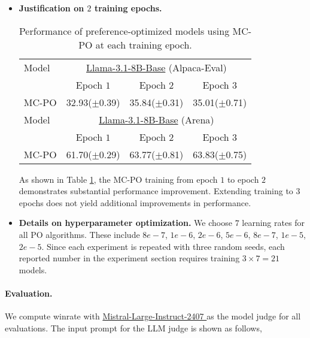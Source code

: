\begin{itemize}
\item \textbf{Justification on $2$ training epochs.}
\begin{table}[h!]
\centering
\begin{tabular}{l|ccc}
\hline
Model & \multicolumn{3}{|c}{\href{https://huggingface.co/allenai/Llama-3.1-Tulu-3-8B-SFT}{Llama-3.1-8B-Base} (Alpaca-Eval)} \\
& Epoch $1$ & Epoch $2$ & Epoch $3$ \\
MC-PO & 32.93($\pm$0.39) & 35.84($\pm$0.31) & 35.01($\pm$0.71) \\ 
\hline
Model & \multicolumn{3}{|c}{\href{https://huggingface.co/allenai/Llama-3.1-Tulu-3-8B-SFT}{Llama-3.1-8B-Base} (Arena)} \\
& Epoch $1$ & Epoch $2$ & Epoch $3$ \\
MC-PO & 61.70($\pm$0.29) & 63.77($\pm$0.81) & 63.83($\pm$0.75) \\ 
\hline
\end{tabular}
\caption{
Performance of preference-optimized models using MC-PO at each training epoch.
}
\label{table: mc-po on all epochs}
\end{table}
As shown in Table \ref{table: mc-po on all epochs},
the MC-PO training from epoch $1$ to epoch $2$ demonstrates substantial performance improvement.
Extending training to $3$ epochs does not yield additional improvements in performance.

\item 
\textbf{Details on hyperparameter optimization.}
We choose $7$ learning rates for all PO algorithms.
These include 
$8e-7$,
$1e-6$,
$2e-6$,
$5e-6$,
$8e-7$,
$1e-5$,
$2e-5$.
Since each experiment is repeated with three random seeds,
each reported number in the experiment section requires training $3 \times 7 = 21$ models.

\end{itemize}


\paragraph{Evaluation.}
We compute winrate with \href{https://huggingface.co/mistralai/Mistral-Large-Instruct-2407}{Mistral-Large-Instruct-2407  } as the model judge for all evaluations.
The input prompt for the LLM judge is shown as follows,



